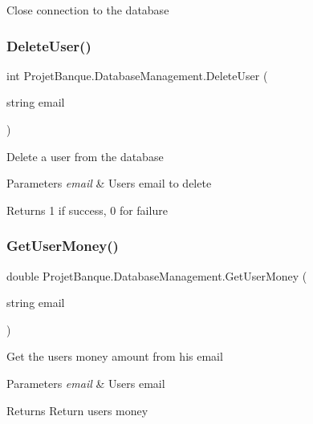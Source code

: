 Close connection to the database 

\mbox{\label{class_projet_banque_1_1_database_management_a1bc7a22d48a79809b752806bcbf1107a}} 
\subsubsection{\texorpdfstring{DeleteUser()}{DeleteUser()}}
{\footnotesize\ttfamily int Projet\+Banque.\+Database\+Management.\+Delete\+User (\begin{DoxyParamCaption}\item[{string}]{email }\end{DoxyParamCaption})}



Delete a user from the database 


\begin{DoxyParams}{Parameters}
{\em email} & User\textquotesingle{}s email to delete\\
\hline
\end{DoxyParams}
\begin{DoxyReturn}{Returns}
1 if success, 0 for failure 
\end{DoxyReturn}
\mbox{\label{class_projet_banque_1_1_database_management_aeee42ee61e0e0a96a7927bf408956881}} 
\subsubsection{\texorpdfstring{GetUserMoney()}{GetUserMoney()}}
{\footnotesize\ttfamily double Projet\+Banque.\+Database\+Management.\+Get\+User\+Money (\begin{DoxyParamCaption}\item[{string}]{email }\end{DoxyParamCaption})}



Get the user\textquotesingle{}s money amount from his email 


\begin{DoxyParams}{Parameters}
{\em email} & User\textquotesingle{}s email\\
\hline
\end{DoxyParams}
\begin{DoxyReturn}{Returns}
Return user\textquotesingle{}s money
\end{DoxyReturn}
\mbox{\label{class_projet_banque_1_1_database_management_ae0af13394741c4671c86ffb098e281e7}} 
